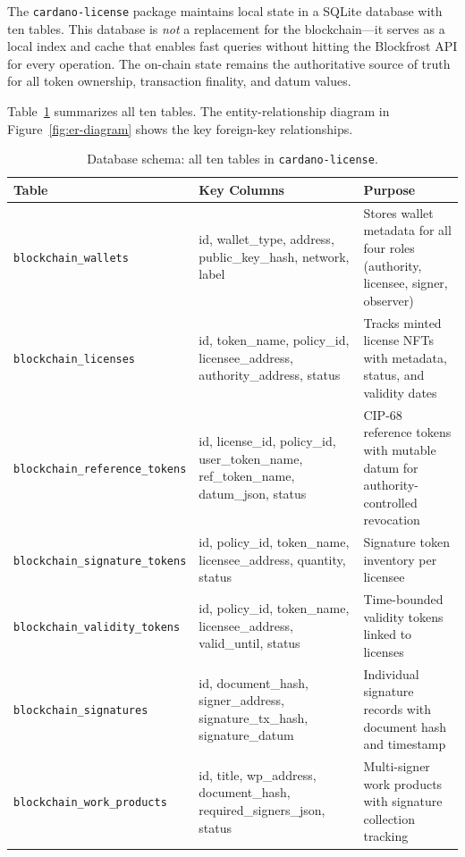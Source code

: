The \texttt{cardano-license} package maintains local state in a SQLite
database with ten tables.  This database is \emph{not} a replacement for the
blockchain---it serves as a local index and cache that enables fast queries
without hitting the Blockfrost API for every operation.  The on-chain state
remains the authoritative source of truth for all token ownership,
transaction finality, and datum values.

Table~\ref{tab:db-schema} summarizes all ten tables.  The
entity-relationship diagram in Figure~\ref{fig:er-diagram} shows the key
foreign-key relationships.

\begin{table}[htbp]
\centering
\caption{Database schema: all ten tables in \texttt{cardano-license}.}
\label{tab:db-schema}
\small
\begin{tabular}{@{}p{3.8cm}p{3.2cm}p{5.5cm}@{}}
\toprule
\textbf{Table} & \textbf{Key Columns} & \textbf{Purpose} \\
\midrule
\texttt{blockchain\_wallets}
  & id, wallet\_type, address, public\_key\_hash, network, label
  & Stores wallet metadata for all four roles (authority, licensee, signer, observer) \\
\addlinespace
\texttt{blockchain\_licenses}
  & id, token\_name, policy\_id, licensee\_address, authority\_address, status
  & Tracks minted license NFTs with metadata, status, and validity dates \\
\addlinespace
\texttt{blockchain\_reference\_tokens}
  & id, license\_id, policy\_id, user\_token\_name, ref\_token\_name, datum\_json, status
  & CIP-68 reference tokens with mutable datum for authority-controlled revocation \\
\addlinespace
\texttt{blockchain\_signature\_tokens}
  & id, policy\_id, token\_name, licensee\_address, quantity, status
  & Signature token inventory per licensee \\
\addlinespace
\texttt{blockchain\_validity\_tokens}
  & id, policy\_id, token\_name, licensee\_address, valid\_until, status
  & Time-bounded validity tokens linked to licenses \\
\addlinespace
\texttt{blockchain\_signatures}
  & id, document\_hash, signer\_address, signature\_tx\_hash, signature\_datum
  & Individual signature records with document hash and timestamp \\
\addlinespace
\texttt{blockchain\_work\_products}
  & id, title, wp\_address, document\_hash, required\_signers\_json, status
  & Multi-signer work products with signature collection tracking \\

\end{tabular}
\end{table}
